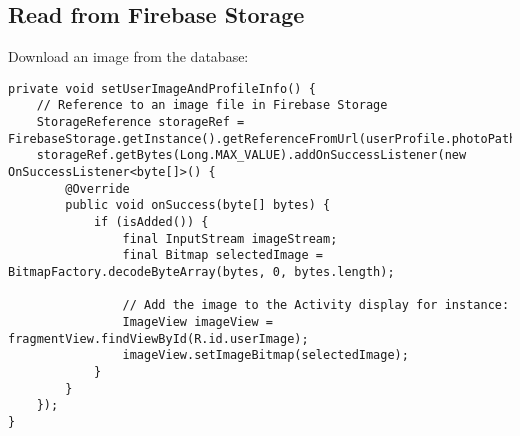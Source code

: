 \documentclass[11pt]{article}
\begin{document}
\subsection{Read from Firebase Storage}
Download an image from the database:
\lstset{language = Java}
\begin{lstlisting}
private void setUserImageAndProfileInfo() {
	// Reference to an image file in Firebase Storage
	StorageReference storageRef = FirebaseStorage.getInstance().getReferenceFromUrl(userProfile.photoPath);
	storageRef.getBytes(Long.MAX_VALUE).addOnSuccessListener(new OnSuccessListener<byte[]>() {
		@Override
		public void onSuccess(byte[] bytes) {
			if (isAdded()) {
				final InputStream imageStream;
				final Bitmap selectedImage = BitmapFactory.decodeByteArray(bytes, 0, bytes.length);
				
				// Add the image to the Activity display for instance:
				ImageView imageView = fragmentView.findViewById(R.id.userImage);
				imageView.setImageBitmap(selectedImage);
			}
		}
	});
}
\end{lstlisting}
\end{document}
